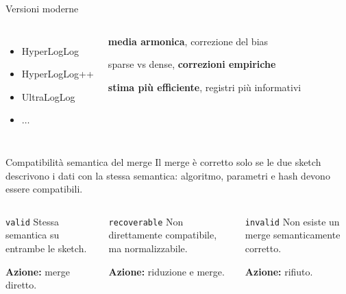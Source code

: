 \documentclass[aspectratio=169, 10pt]{beamer}
\begin{document}
  \begin{frame}{Versioni moderne}
    \begin{columns}[T,onlytextwidth]
        \begin{itemize}
          \item HyperLogLog
          \item HyperLogLog++
          \item UltraLogLog 
          \item $\dots$
        \end{itemize}

        \begin{description}
          \item \textbf{media armonica}, correzione del bias
          \item sparse vs dense, \textbf{correzioni empiriche}
          \item \textbf{stima pi\`u efficiente}, registri pi\`u informativi 
        \end{description}
    \end{columns}
  \end{frame}

  \begin{frame}{Compatibilit\`a semantica del merge}
    \small
    Il merge \`e corretto solo se le due sketch descrivono i dati con la \alert{stessa semantica}: algoritmo, parametri e hash devono essere compatibili.

    \vspace{0.8em}

    \begin{columns}[T,onlytextwidth]
        \begin{exampleblock}{\texttt{valid}}
          Stessa semantica su entrambe le sketch.

          \vspace{0.4em}
          \textbf{Azione:} merge diretto.
        \end{exampleblock}

        \begin{block}{\texttt{recoverable}}
          Non direttamente compatibile, ma normalizzabile.

          \vspace{0.4em}
          \textbf{Azione:} riduzione e merge.
        \end{block}

        \begin{alertblock}{\texttt{invalid}}
          Non esiste un merge semanticamente corretto.

          \vspace{0.4em}
          \textbf{Azione:} rifiuto.
        \end{alertblock}
    \end{columns}
  \end{frame}
\end{document}

